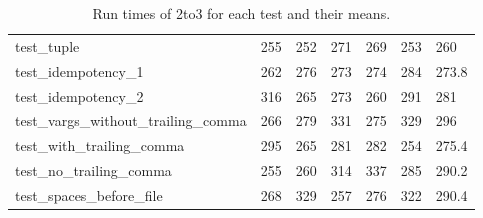 \begin{table}[h]
\begin{tabular}{@{}l|llllll@{}}
    test\_tuple                           & 255                  & 252                  & 271                  & 269                  & 253                  & 260                        \\
    test\_idempotency\_1                  & 262                  & 276                  & 273                  & 274                  & 284                  & 273.8                      \\
    test\_idempotency\_2                  & 316                  & 265                  & 273                  & 260                  & 291                  & 281                        \\
    test\_vargs\_without\_trailing\_comma & 266                  & 279                  & 331                  & 275                  & 329                  & 296                        \\
    test\_with\_trailing\_comma           & 295                  & 265                  & 281                  & 282                  & 254                  & 275.4                      \\
    test\_no\_trailing\_comma             & 255                  & 260                  & 314                  & 337                  & 285                  & 290.2                      \\
    test\_spaces\_before\_file            & 268                  & 329                  & 257                  & 276                  & 322                  & 290.4                     
    \end{tabular}
    \caption{Run times of 2to3 for each test and their means.}
\end{table}

